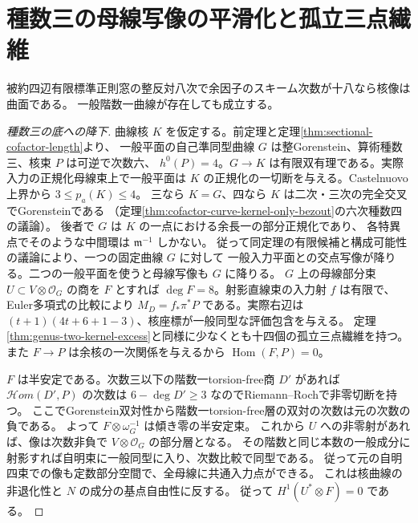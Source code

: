 \section{種数三の母線写像の平滑化と孤立三点繊維}
\label{sec:genus-three-kernel-excess}
\begin{theorem}\label{thm:genus-three-kernel-excess}
被約四辺有限標準正則窓の整反対八次で余因子のスキーム次数が十八なら核像は曲面である。
一般階数一曲線が存在しても成立する。
\end{theorem}
\begin{proof}[種数三の底への降下]
曲線核 $K$ を仮定する。前定理と定理\ref{thm:sectional-cofactor-length}より、
一般平面の自己準同型曲線 $G$ は整Gorenstein、算術種数三、核束 $P$ は可逆で次数六、
$h^0(P)=4$。$G\to K$ は有限双有理である。実際入力の正規化母線束上で一般平面は
$K$ の正規化の一切断を与える。Castelnuovo上界から $3\le p_a(K)\le4$。
三なら $K=G$、四なら $K$ は二次・三次の完全交叉でGorensteinである
（定理\ref{thm:cofactor-curve-kernel-only-bezout}の六次種数四の議論）。
後者で $G$ は $K$ の一点における余長一の部分正規化であり、
各特異点でそのような中間環は $\mathfrak m^{-1}$ しかない。
従って同定理の有限候補と構成可能性の議論により、一つの固定曲線 $G$ に対して
一般入力平面との交点写像が降りる。二つの一般平面を使うと母線写像も $G$ に降りる。
$G$ 上の母線部分束 $U\subset V\otimes\mathcal O_G$ の商を $F$ とすれば
$\deg F=8$。射影直線束の入力射 $f$ は有限で、Euler多項式の比較により
$M_D=f_*\pi^*P$ である。実際右辺は $(t+1)(4t+6+1-3)$、核座標が一般同型な評価包含を与える。
定理\ref{thm:genus-two-kernel-excess}と同様に少なくとも十四個の孤立三点繊維を持つ。
また $F\to P$ は余核の一次関係を与えるから $\operatorname{Hom}(F,P)=0$。

$F$ は半安定である。次数三以下の階数一torsion-free商 $D'$ があれば
$\mathcal Hom(D',P)$ の次数は $6-\deg D'\ge3$ なのでRiemann--Rochで非零切断を持つ。
ここでGorenstein双対性から階数一torsion-free層の双対の次数は元の次数の負である。
よって $F\otimes\omega_G^{-1}$ は傾き零の半安定束。
これから $U$ への非零射があれば、像は次数非負で $V\otimes\mathcal O_G$ の部分層となる。
その階数と同じ本数の一般成分に射影すれば自明束に一般同型に入り、次数比較で同型である。
従って元の自明四束での像も定数部分空間で、全母線に共通入力点ができる。
これは核曲線の非退化性と $N$ の成分の基点自由性に反する。
従って $H^1(U^*\otimes F)=0$ である。
\end{proof}

